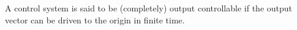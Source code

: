 \documentclass[12pt]{article}
\begin{document}
A control system is said to be (completely) output controllable if the output vector can be driven to the origin in finite time.
\end{document}

